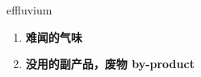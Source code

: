 
\begin{frame}
{\huge effluvium}
\begin{center}
\begin{enumerate}\Large
  \item \textbf{难闻的气味}
  \item \textbf{没用的副产品，废物 by-product}
\end{enumerate}
\end{center}
\end{frame}
